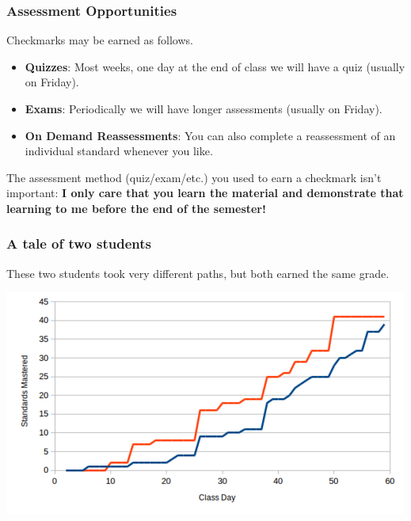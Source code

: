 \documentclass[aspectration=1610]{beamer}
\begin{document}
\begin{frame}\frametitle{Assessment Opportunities}
Checkmarks may be earned as follows.
\begin{itemize}
\item {\bf Quizzes}: Most weeks, one day at the end of class we will have a quiz (usually on Friday). 
\item {\bf Exams}: Periodically we will have longer assessments (usually on Friday).
\item {\bf On Demand Reassessments}: You can also complete a reassessment of an individual standard whenever you like.
\end{itemize}

\pause

\vspace{0.2in}

The assessment method (quiz/exam/etc.) you used to earn a checkmark
isn't important: \textbf{I only care that you
learn the material and demonstrate that learning to me before the end of the
semester!}
\end{frame}

\begin{frame}\frametitle{A tale of two students}
These two students took very different paths, but both earned the same grade.
\begin{center}
\includegraphics[scale=0.7]{student-comparison.png}
\end{center}
\end{frame}
\end{document}
